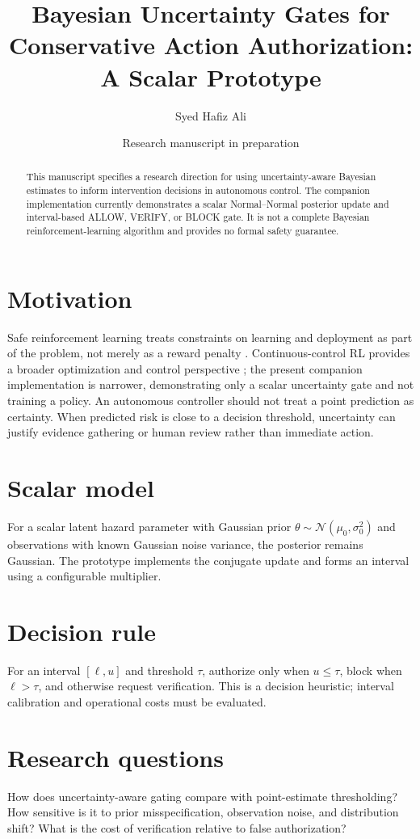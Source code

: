 \documentclass[11pt]{article}
\title{Bayesian Uncertainty Gates for Conservative Action Authorization: A Scalar Prototype}
\author{Syed Hafiz Ali}
\date{Research manuscript in preparation}
\begin{document}
\maketitle
\begin{abstract}
This manuscript specifies a research direction for using uncertainty-aware Bayesian estimates to inform intervention decisions in autonomous control. The companion implementation currently demonstrates a scalar Normal--Normal posterior update and interval-based ALLOW, VERIFY, or BLOCK gate. It is not a complete Bayesian reinforcement-learning algorithm and provides no formal safety guarantee.
\end{abstract}
\section{Motivation}
Safe reinforcement learning treats constraints on learning and deployment as part of the problem, not merely as a reward penalty \cite{garcia2015safe,berkenkamp2017safe}. Continuous-control RL provides a broader optimization and control perspective \cite{recht2019tour}; the present companion implementation is narrower, demonstrating only a scalar uncertainty gate and not training a policy.
An autonomous controller should not treat a point prediction as certainty. When predicted risk is close to a decision threshold, uncertainty can justify evidence gathering or human review rather than immediate action.
\section{Scalar model}
For a scalar latent hazard parameter with Gaussian prior $\theta\sim\mathcal{N}(\mu_0,\sigma_0^2)$ and observations with known Gaussian noise variance, the posterior remains Gaussian. The prototype implements the conjugate update and forms an interval using a configurable multiplier.
\section{Decision rule}
For an interval $[\ell,u]$ and threshold $\tau$, authorize only when $u\leq\tau$, block when $\ell>\tau$, and otherwise request verification. This is a decision heuristic; interval calibration and operational costs must be evaluated.
\section{Research questions}
How does uncertainty-aware gating compare with point-estimate thresholding? How sensitive is it to prior misspecification, observation noise, and distribution shift? What is the cost of verification relative to false authorization?
\end{document}
